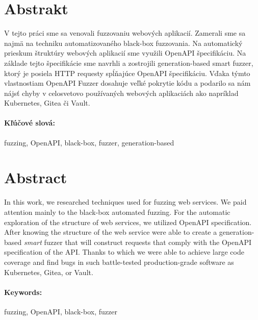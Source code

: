 \documentclass[12pt, twoside]{book}
\begin{document}
\section*{Abstrakt}

V tejto práci sme sa venovali fuzzovaniu webových aplikacií. Zamerali sme sa najmä na techniku automatizovaného black-box fuzzovania. Na automatický prieskum štruktúry webových aplikacií sme využili OpenAPI špecifikáciu. Na základe tejto špecifikácie sme navrhli a zostrojili generation-based smart fuzzer, ktorý je posiela HTTP requesty spĺňajúce OpenAPI špecifikáciu. Vďaka týmto vlastnostiam OpenAPI Fuzzer dosahuje veľké pokrytie kódu a podarilo sa nám nájsť chyby v celosvetovo používaných webových aplikaciách ako napríklad Kubernetes, Gitea či Vault.


\paragraph*{Kľúčové slová:} fuzzing, OpenAPI, black-box, fuzzer, generation-based


\newpage
\section*{Abstract}
In this work, we researched techniques used for fuzzing web services. We paid attention mainly to the black-box automated fuzzing. For the automatic exploration of the structure of web services, we utilized OpenAPI specification. After knowing the structure of the web service were able to create a generation-based \textit{smart} fuzzer that will construct requests that comply with the OpenAPI specification of the API. Thanks to which we were able to achieve large code coverage and find bugs in such battle-tested production-grade software as Kubernetes, Gitea, or Vault.

\paragraph*{Keywords:} fuzzing, OpenAPI, black-box, fuzzer




\newpage

\tableofcontents

\end{document}
